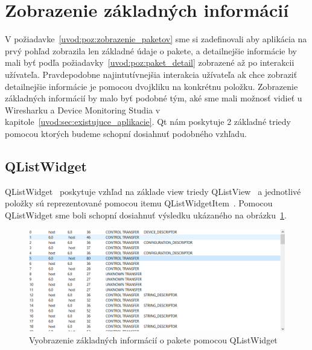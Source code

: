 \section{Zobrazenie základných informácií}
\label{kap03:sec:zobr_zakl}
V požiadavke~\ref{uvod:poz:zobrazenie_paketov} sme si zadefinovali aby aplikácia na prvý pohľad zobrazila len základné údaje o pakete, a detailnejšie informácie by mali byť podľa požiadavky~\ref{uvod:poz:paket_detail} zobrazené až po interakcii užívateľa. Pravdepodobne najintutívnejšia interakcia užívateľa ak chce zobraziť detailnejšie informácie je pomocou dvojkliku na konkrétnu položku. Zobrazenie základných informácií by malo byť podobné tým, aké sme mali možnosť vidieť u Wiresharku a Device Monitoring Studia v kapitole~\ref{uvod:sec:existujuce_aplikacie}. Qt nám poskytuje 2 základné triedy pomocou ktorých budeme schopní dosiahnuť podobného vzhľadu.

\subsection*{QListWidget}
QListWidget~\cite{qlistwidget} poskytuje vzhľad na základe view triedy QListView~\cite{qlistview} a jednotlivé položky sú reprezentované pomocou itemu QListWidgetItem~\cite{qlistwidgetitem}. Pomocou QListWidget sme boli schopní dosiahnuť výsledku ukázaného na obrázku~\ref{obr:kap3:ListViewLook}.

\begin{figure}[!htb]
	\centering
	\includegraphics[width=\textwidth]{img/kap03_ListViewLook}
	\caption{Vyobrazenie základných informácií o pakete pomocou QListWidget}
	\label{obr:kap3:ListViewLook}
\end{figure}

